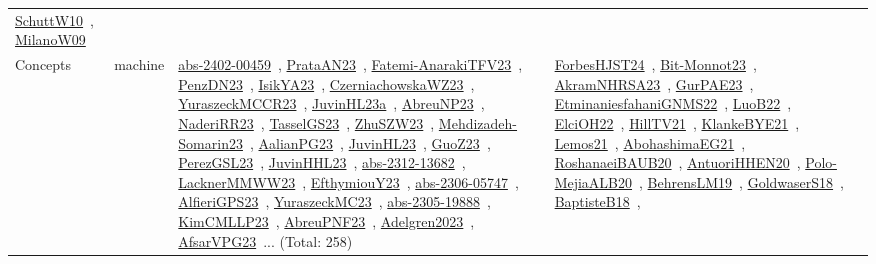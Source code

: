 {\begin{longtable}{lp{3cm}>{\raggedright\arraybackslash}p{6cm}>{\raggedright\arraybackslash}p{6cm}>{\raggedright\arraybackslash}p{8cm}}
\href{works/SchuttW10.pdf}{SchuttW10}~\cite{SchuttW10}, \href{works/MilanoW09.pdf}{MilanoW09}~\cite{MilanoW09}\\
Concepts & machine & \href{works/abs-2402-00459.pdf}{abs-2402-00459}~\cite{abs-2402-00459}, \href{works/PrataAN23.pdf}{PrataAN23}~\cite{PrataAN23}, \href{works/Fatemi-AnarakiTFV23.pdf}{Fatemi-AnarakiTFV23}~\cite{Fatemi-AnarakiTFV23}, \href{works/PenzDN23.pdf}{PenzDN23}~\cite{PenzDN23}, \href{works/IsikYA23.pdf}{IsikYA23}~\cite{IsikYA23}, \href{works/CzerniachowskaWZ23.pdf}{CzerniachowskaWZ23}~\cite{CzerniachowskaWZ23}, \href{works/YuraszeckMCCR23.pdf}{YuraszeckMCCR23}~\cite{YuraszeckMCCR23}, \href{works/JuvinHL23a.pdf}{JuvinHL23a}~\cite{JuvinHL23a}, \href{works/AbreuNP23.pdf}{AbreuNP23}~\cite{AbreuNP23}, \href{works/NaderiRR23.pdf}{NaderiRR23}~\cite{NaderiRR23}, \href{works/TasselGS23.pdf}{TasselGS23}~\cite{TasselGS23}, \href{works/ZhuSZW23.pdf}{ZhuSZW23}~\cite{ZhuSZW23}, \href{works/Mehdizadeh-Somarin23.pdf}{Mehdizadeh-Somarin23}~\cite{Mehdizadeh-Somarin23}, \href{works/AalianPG23.pdf}{AalianPG23}~\cite{AalianPG23}, \href{works/JuvinHL23.pdf}{JuvinHL23}~\cite{JuvinHL23}, \href{works/GuoZ23.pdf}{GuoZ23}~\cite{GuoZ23}, \href{works/PerezGSL23.pdf}{PerezGSL23}~\cite{PerezGSL23}, \href{works/JuvinHHL23.pdf}{JuvinHHL23}~\cite{JuvinHHL23}, \href{works/abs-2312-13682.pdf}{abs-2312-13682}~\cite{abs-2312-13682}, \href{works/LacknerMMWW23.pdf}{LacknerMMWW23}~\cite{LacknerMMWW23}, \href{works/EfthymiouY23.pdf}{EfthymiouY23}~\cite{EfthymiouY23}, \href{works/abs-2306-05747.pdf}{abs-2306-05747}~\cite{abs-2306-05747}, \href{works/AlfieriGPS23.pdf}{AlfieriGPS23}~\cite{AlfieriGPS23}, \href{works/YuraszeckMC23.pdf}{YuraszeckMC23}~\cite{YuraszeckMC23}, \href{works/abs-2305-19888.pdf}{abs-2305-19888}~\cite{abs-2305-19888}, \href{works/KimCMLLP23.pdf}{KimCMLLP23}~\cite{KimCMLLP23}, \href{works/AbreuPNF23.pdf}{AbreuPNF23}~\cite{AbreuPNF23}, \href{works/Adelgren2023.pdf}{Adelgren2023}~\cite{Adelgren2023}, \href{works/AfsarVPG23.pdf}{AfsarVPG23}~\cite{AfsarVPG23}... (Total: 258) & \href{works/ForbesHJST24.pdf}{ForbesHJST24}~\cite{ForbesHJST24}, \href{works/Bit-Monnot23.pdf}{Bit-Monnot23}~\cite{Bit-Monnot23}, \href{works/AkramNHRSA23.pdf}{AkramNHRSA23}~\cite{AkramNHRSA23}, \href{works/GurPAE23.pdf}{GurPAE23}~\cite{GurPAE23}, \href{works/EtminaniesfahaniGNMS22.pdf}{EtminaniesfahaniGNMS22}~\cite{EtminaniesfahaniGNMS22}, \href{works/LuoB22.pdf}{LuoB22}~\cite{LuoB22}, \href{works/ElciOH22.pdf}{ElciOH22}~\cite{ElciOH22}, \href{works/HillTV21.pdf}{HillTV21}~\cite{HillTV21}, \href{works/KlankeBYE21.pdf}{KlankeBYE21}~\cite{KlankeBYE21}, \href{works/Lemos21.pdf}{Lemos21}~\cite{Lemos21}, \href{works/AbohashimaEG21.pdf}{AbohashimaEG21}~\cite{AbohashimaEG21}, \href{works/RoshanaeiBAUB20.pdf}{RoshanaeiBAUB20}~\cite{RoshanaeiBAUB20}, \href{works/AntuoriHHEN20.pdf}{AntuoriHHEN20}~\cite{AntuoriHHEN20}, \href{works/Polo-MejiaALB20.pdf}{Polo-MejiaALB20}~\cite{Polo-MejiaALB20}, \href{works/BehrensLM19.pdf}{BehrensLM19}~\cite{BehrensLM19}, \href{works/GoldwaserS18.pdf}{GoldwaserS18}~\cite{GoldwaserS18}, \href{works/BaptisteB18.pdf}{BaptisteB18}~\cite{BaptisteB18}, 
\end{longtable}}
